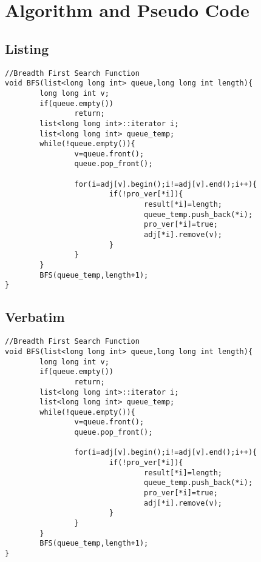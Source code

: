 \documentclass{article}
\begin{document}
\newpage
\section{Algorithm and Pseudo Code}
\subsection{Listing}
\hline
 
\begin{lstlisting}
//Breadth First Search Function
void BFS(list<long long int> queue,long long int length){
        long long int v;
        if(queue.empty())
                return;
        list<long long int>::iterator i;
        list<long long int> queue_temp;
        while(!queue.empty()){
                v=queue.front();
                queue.pop_front();
                
                for(i=adj[v].begin();i!=adj[v].end();i++){
                        if(!pro_ver[*i]){
                                result[*i]=length;
                                queue_temp.push_back(*i);
                                pro_ver[*i]=true;
                                adj[*i].remove(v);
                        }
                }
        }
        BFS(queue_temp,length+1);
}    
\end{lstlisting}
\hline
\newpage

\subsection{Verbatim}

\begin{verbatim}
//Breadth First Search Function
void BFS(list<long long int> queue,long long int length){
        long long int v;
        if(queue.empty())
                return;
        list<long long int>::iterator i;
        list<long long int> queue_temp;
        while(!queue.empty()){
                v=queue.front();
                queue.pop_front();
                
                for(i=adj[v].begin();i!=adj[v].end();i++){
                        if(!pro_ver[*i]){
                                result[*i]=length;
                                queue_temp.push_back(*i);
                                pro_ver[*i]=true;
                                adj[*i].remove(v);
                        }
                }
        }
        BFS(queue_temp,length+1);
}    
\end{verbatim}
\newpage
\end{document}
